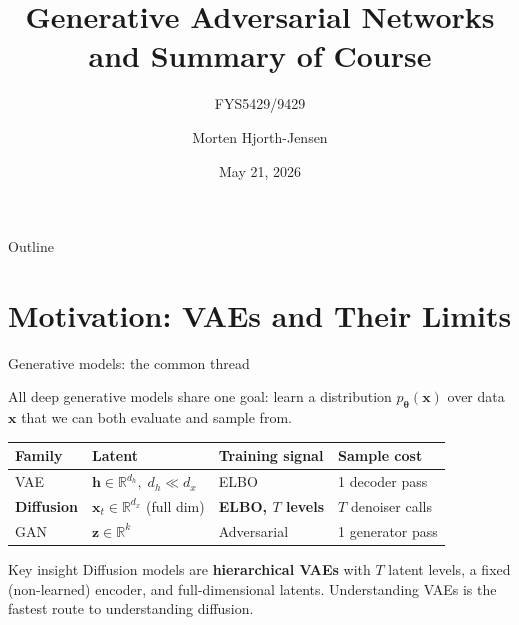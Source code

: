 \documentclass[aspectratio=169,11pt]{beamer}
\title[GANs]{Generative Adversarial Networks and Summary of Course}
\subtitle{FYS5429/9429}
\author[M.\ Hjorth-Jensen]{Morten Hjorth-Jensen}
\institute[UiO/MSU]{Department of Physics \& CCSE, University of Oslo}
\date{May 21, 2026}
\newcommand{\R}{\mathbb{R}}
\newcommand{\bx}{\bm{x}}
\newcommand{\bh}{\bm{h}}
\newcommand{\bz}{\bm{z}}
\newcommand{\btheta}{\bm{\theta}}
\begin{document}

\begin{frame}[plain]
  \titlepage
\end{frame}

\begin{frame}[allowframebreaks]{Outline}
  \scriptsize
  \tableofcontents[hideallsubsections]
\end{frame}

\section{Motivation: VAEs and Their Limits}

\begin{frame}{Generative models: the common thread}

All deep generative models share one goal: learn a distribution
$p_{\btheta}(\bx)$ over data~$\bx$ that we can both evaluate and sample from.

\medskip
\begin{center}
\renewcommand{\arraystretch}{1.25}
\begin{tabular}{llll}
\toprule
\textbf{Family} & \textbf{Latent} & \textbf{Training signal} & \textbf{Sample cost}\\
\midrule
VAE            & $\bh \in \R^{d_h},\;d_h\!\ll\!d_x$ & ELBO             & 1 decoder pass\\
\textbf{Diffusion} & $\bx_t\in\R^{d_x}$ (full dim)  & \textbf{ELBO, $T$ levels} & $T$ denoiser calls\\
GAN            & $\bz\in\R^k$                       & Adversarial      & 1 generator pass\\
\bottomrule
\end{tabular}
\end{center}

\medskip
\begin{alertblock}{Key insight}
Diffusion models are \textbf{hierarchical VAEs} with $T$ latent levels,
a fixed (non-learned) encoder, and full-dimensional latents.
Understanding VAEs is the fastest route to understanding diffusion.
\end{alertblock}
\end{frame}
\end{document}
